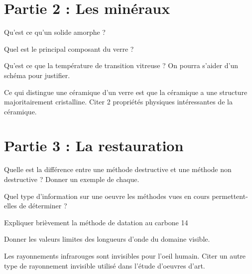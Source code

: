 \documentclass[addpoints]{exam}
\begin{document}
\section{Partie 2 : Les minéraux}

\begin{questions}

\question[2] Qu'est ce qu'un solide amorphe ?

\question[2] Quel est le principal composant du verre ? 

\question[1] Qu'est ce que la température de transition vitreuse ? On pourra s'aider d'un schéma pour justifier. 

\question[1] Ce qui distingue une céramique d'un verre est que la céramique a une structure majoritairement cristalline. Citer 2 propriétés physiques intéressantes de la céramique.

\end{questions}


\section{Partie 3 : La restauration}

\begin{questions}

\question[2] Quelle est la différence entre une méthode destructive et une méthode non destructive ? Donner un exemple de chaque.

\question[2] Quel type d'information sur une oeuvre les méthodes vues en cours permettent-elles de déterminer ?

\question[1] Expliquer brièvement la méthode de datation au carbone 14 

\question[1] Donner les valeurs limites des longueurs d'onde du domaine visible.

\question[1] Les rayonnements infrarouges sont invisibles pour l'oeil humain. Citer un autre type de rayonnement invisible utilisé dans l'étude d'oeuvres d'art.

\end{questions}


\end{document}
